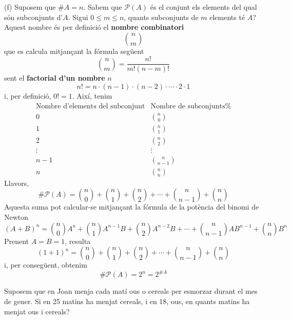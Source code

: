 \begin{solucio}
(f) Suposem que $\#A=n$. Sabem que $\mathcal{P}(A)$ és el conjunt els
elements del qual són subconjunts d'$A$. Sigui $0\leq m\leq n$, quants
subconjunts de $m$ elements té $A$? Aquest nombre és per definició el \textbf{nombre combinatori}
\begin{equation*}
\binom{n}{m}
\end{equation*}%
que es calcula mitjançant la fórmula següent%
\begin{equation*}
\binom{n}{m}=\frac{n!}{m!\left( n-m\right) !}
\end{equation*}%
sent el \textbf{factorial d'un nombre} $n$%
\begin{equation*}
n!=n\cdot (n-1)\cdot (n-2)\cdot \cdots \cdot 2\cdot 1
\end{equation*}%
i, per definició, $0!=1$. Així, tenim%
\begin{equation*}
\begin{array}{cc}
\text{Nombre d'elements del subconjunt} & \text{Nombre de subconjunts%
} \\
0 & \binom{n}{0} \\
1 & \binom{n}{1} \\
2 & \binom{n}{2} \\
\vdots & \vdots \\
n-1 & \binom{n}{n-1} \\
n & \binom{n}{n}%
\end{array}%
\end{equation*}%
Llavors,%
\begin{equation*}
\#\mathcal{P}(A)=\binom{n}{0}+\binom{n}{1}+\binom{n}{2}+\cdots +\binom{n}{n-1%
}+\binom{n}{n}
\end{equation*}%
Aquesta suma pot calcular-se mitjançant la fórmula de la potència del binomi de Newton
\begin{equation*}
(A+B)^{n}=\binom{n}{0}A^{n}+\binom{n}{1}A^{n-1}B+\binom{n}{2}A^{n-2}B+\cdots
+\binom{n}{n-1}AB^{n-1}+\binom{n}{n}B^{n}
\end{equation*}%
Prenent $A=B=1$, resulta%
\begin{equation*}
(1+1)^{n}=\binom{n}{0}+\binom{n}{1}+\binom{n}{2}+\cdots +\binom{n}{n-1}+%
\binom{n}{n}
\end{equation*}%
i, per consegüent, obtenim%
\begin{equation*}
\#\mathcal{P}(A)=2^{n}=2^{\#A}
\end{equation*}
\end{solucio}

\begin{exercici}
Suposem que en Joan menja cada matí ous o cereals per esmorzar durant
el mes de gener. Si en 25 matins ha menjat cereals, i en 18, ous, en quants
matins ha menjat ous i cereals?
\end{exercici}

